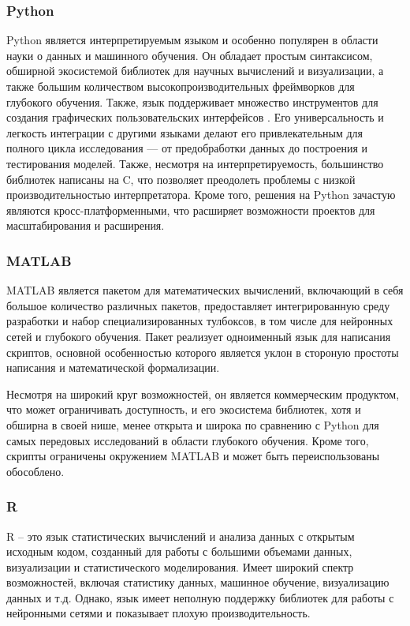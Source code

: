 \subsubsection{Python}
Python является интерпретируемым языком и особенно популярен в области науки о
данных и машинного обучения. Он обладает простым синтаксисом, обширной
экосистемой библиотек для научных вычислений и визуализации, а также большим
количеством высокопроизводительных фреймворков для глубокого обучения. Также,
язык поддерживает множество инструментов для создания графических
пользовательских интерфейсов \cite{bib:gui:web:model}. Его универсальность и легкость 
интеграции с
другими языками делают его привлекательным для полного цикла исследования — от
предобработки данных до построения и тестирования моделей. Также, несмотря на
интерпретируемость, большинство библиотек написаны на C, что позволяет
преодолеть проблемы с низкой производительностью интерпретатора. Кроме того,
решения на Python зачастую являются кросс-платформенными, что расширяет
возможности проектов для масштабирования и расширения. 

\subsubsection{MATLAB} 
MATLAB является пакетом для математических вычислений, включающий в себя
большое количество различных пакетов, предоставляет интегрированную среду
разработки и набор специализированных тулбоксов, в том числе для нейронных
сетей и глубокого обучения. Пакет реализует одноименный язык для написания
скриптов, основной особенностью которого является уклон в стороную простоты
написания и математической формализации.

Несмотря на широкий круг возможностей, он является коммерческим продуктом, что
может ограничивать доступность, и его экосистема библиотек, хотя и обширна в
своей нише, менее открыта и широка по сравнению с Python для самых передовых
исследований в области глубокого обучения. Кроме того, скрипты ограничены
окружением MATLAB и может быть переиспользованы обособлено.

\subsubsection{R}

R – это язык статистических вычислений и анализа данных с открытым исходным
кодом, созданный для работы с большими объемами данных, визуализации и
статистического моделирования. Имеет широкий спектр возможностей, включая
статистику данных, машинное обучение, визуализацию данных и т.д. Однако, язык
имеет неполную поддержку библиотек для работы с нейронными сетями и показывает
плохую производительность.

